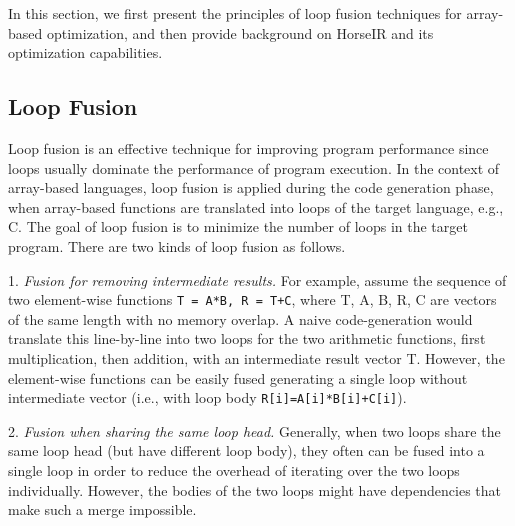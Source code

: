 
In this section, we first present the principles of loop fusion techniques for
array-based optimization, and then provide background on HorseIR and its
optimization capabilities. 

\subsection{Loop Fusion}

Loop fusion is an effective technique for improving program performance since
loops usually dominate the performance of program execution.
In the context of array-based languages, loop fusion is applied during the code
generation phase, when array-based functions are translated into loops of the
target language, e.g., C. The goal of loop fusion is to minimize the number of
loops in the target program.
There are two kinds of loop fusion as follows.

1. \textit{Fusion for removing intermediate results.}
For example, assume the sequence of two element-wise functions
\texttt{T = A*B, R = T+C}, where T, A, B, R, C are vectors of the same length
with no memory overlap.
A naive code-generation would translate this line-by-line into two loops for
the two arithmetic functions, first multiplication, then addition, with an
intermediate result vector T.
However, the element-wise functions can be easily fused generating a single
loop without intermediate vector (i.e., with loop body \texttt{R[i]=A[i]*B[i]+C[i]}).

2. \textit{Fusion when sharing the same loop head.}
Generally, when two loops share the same loop head (but have different loop
body), they often can be fused into a single loop in order to reduce the
overhead of iterating over the two loops individually. However, the bodies of
the two loops might have dependencies that make such a merge impossible. 



